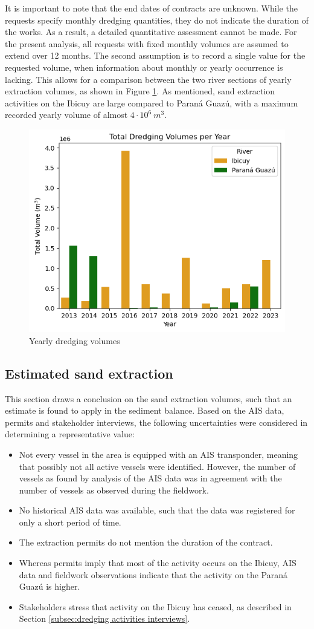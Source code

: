 It is important to note that the end dates of contracts are unknown. While the requests specify monthly dredging quantities, they do not indicate the duration of the works. As a result, a detailed quantitative assessment cannot be made. For the present analysis, all requests with fixed monthly volumes are assumed to extend over 12 months. The second assumption is to record a single value for the requested volume, when information about monthly or yearly occurrence is lacking. This allows for a comparison between the two river sections of yearly extraction volumes, as shown in Figure \ref{fig:yearly dredging volumes}. As mentioned, sand extraction activities on the Ibicuy are large compared to Paraná Guazú, with a maximum recorded yearly volume of almost $4 \cdot 10^6 ~m^3$.  

\begin{figure}[H]
    \centering
    \includegraphics[width=0.50\linewidth]{figures/ch2/Dredging volumes permits.png}
    \caption{Yearly dredging volumes}
    \label{fig:yearly dredging volumes}
\end{figure}

\subsection{Estimated sand extraction}
This section draws a conclusion on the sand extraction volumes, such that an estimate is found to apply in the sediment balance. Based on the AIS data, permits and stakeholder interviews, the following uncertainties were considered in determining a representative value:

\begin{itemize}
    \item Not every vessel in the area is equipped with an AIS transponder, meaning that possibly not all active vessels were identified. However, the number of vessels as found by analysis of the AIS data was in agreement with the number of vessels as observed during the fieldwork.
    \item No historical AIS data was available, such that the data was registered for only a short period of time.
    \item The extraction permits do not mention the duration of the contract.
    \item Whereas permits imply that most of the activity occurs on the Ibicuy, AIS data and fieldwork observations indicate that the activity on the Paraná Guazú is higher. 
    \item Stakeholders stress that activity on the Ibicuy has ceased, as described in Section \ref{subsec:dredging activities interviews}.
\end{itemize}

